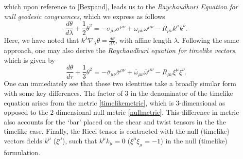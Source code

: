 which upon reference to \eqref{Bexpand}, leads us to the \emph{Raychaudhuri Equation for null geodesic congruences}, which we express as follows
\[
\label{Raych}
\frac{d\theta}{d\lambda}+\frac{1}{2}\theta^{2}=-\sigma_{\mu\nu}\sigma^{\mu\nu}+\omega_{\mu\nu}\omega^{\mu\nu}-R_{\mu\nu}k^{\mu}k^{\nu}.
 \]
Here, we have noted that $k^{\lambda}\nabla_{\lambda}\theta=\frac{d\theta}{d\lambda}$, with affine length $\lambda$. Following the same approach, one may also derive the \emph{Raychaudhuri equation for timelike vectors}, which is given by
\[
\label{Raychtimelike}
\frac{d\theta}{d\tau}+\frac{1}{3}\theta^{2}=-{\bar \sigma}_{\mu\nu}{\bar \sigma}^{\mu\nu}+{\bar \omega}_{\mu\nu}{\bar \omega}^{\mu\nu}-R_{\mu\nu}\xi^{\mu}\xi^{\nu}.
 \]
One can immediately see that these two identities take a broadly similar form with some key differences. The factor of $3$ in the denominator of the timelike equation arises from the  metric \eqref{timelikemetric}, which is $3$-dimensional as opposed to the $2$-dimensional null metric \eqref{nullmetric}. This difference in metric also accounts for the `bar' placed on the shear and twist tensors in the the timelike case. Finally, the Ricci tensor is contracted with the null (timelike) vectors fields $k^\mu$ ($\xi^\mu$), such that $k^\mu k_\mu=0$ ($\xi^\mu \xi_\mu=-1$) in the null (timelike) formulation. 
